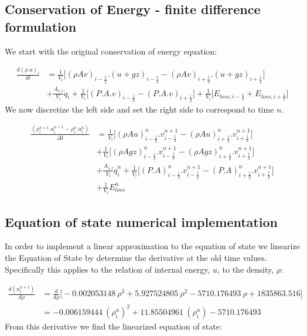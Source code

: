 \documentclass[11pt,letterpaper,titlepage]{article}
\newcommand{\half}{\frac{1}{2}}
\begin{document}
\vspace{1cm}
\subsection{Conservation of Energy - finite difference formulation}
We start with the original conservation of energy equation:

\begin{equation*}
\begin{aligned}
\frac{d(\rho.u)_i}{dt} &=\frac{1}{V_i}\biggr[ (\rho Av)_{i-\half}.(u+gz)_{i-\half} - (\rho Av)_{i+\half}.(u+gz)_{i+\half} \biggr] \\
&+\frac{A_{s,i}}{V_i}\dot{q}_i + \frac{1}{V_i}\biggr[   (P.A.v)_{i-\half} - (P.A.v)_{i+\half}   \biggr] + \frac{1}{V_i}\biggr[  E_{loss,i-\half} +E_{loss,i+\half}   \biggr]
\end{aligned}
\end{equation*}
\newline
\noindent We now discretize the left side and set the right side to correspond to time $n$.

\begin{equation}
\begin{aligned}
\frac{(\rho_i^{n+1}.u_i^{n+1}-  \rho_i^{n}.u_i^{n})}{\Delta t}&=\frac{1}{V_i}\biggr[ (\rho Au)_{i-\half}^n.v_{i-\half}^{n+1} -(\rho Au)_{i+\half}^n.v_{i+\half}^{n+1} \biggr] \\
&+\frac{1}{V_i}\biggr[ (\rho Agz)_{i-\half}^n.v_{i-\half}^{n+1} -(\rho Agz)_{i+\half}^n.v_{i+\half}^{n+1} \biggr] \\
&+\frac{A_{s,i}}{V_i}\dot{q}_i^n + \frac{1}{V_i}\biggr[   (P.A)_{i-\half}^n.v_{i-\half}^{n+1} - (P.A)_{i+\half}^n.v_{i+\half}^{n+1}   \biggr] \\
&+ \frac{1}{V_i}E_{loss}^n
\end{aligned}
\end{equation}



\subsection{Equation of state numerical implementation}
In order to implement a linear approximation to the equation of state we linearize the Equation of State by determine the derivative at the old time values. Specifically this applies to the relation of internal energy, $u$, to the density, $\rho$:

\begin{equation*}
\begin{aligned}
\frac{d(u_i^{n+1})}{d\rho}&=\frac{d}{d\rho} \biggr[  -0.002053148 \ \rho^3+5.927524805 \ \rho^2-5710.176493 \ \rho+1835863.516    \biggr] \\
                          &=-0.006159444 \ (\rho_{i}^{n})^2+11.85504961 \ (\rho_{i}^{n}) -5710.176493 
\end{aligned}
\end{equation*}
\newline
From this derivative we find the linearized equation of state:
\end{document}
